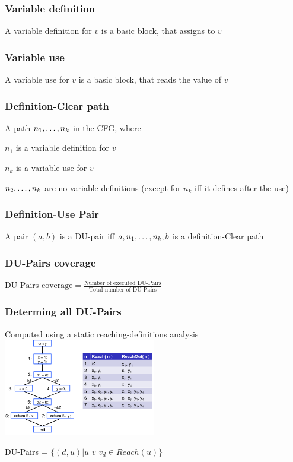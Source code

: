 \subsubsection{Variable definition}
\enumstart
	\item A variable definition for $v$ is a basic block, that assigns to $v$
\enumend

\subsubsection{Variable use}
\enumstart
	\item A variable use for $v$ is a basic block, that reads the value of $v$
\enumend

\subsubsection{Definition-Clear path}
\enumstart
	\item A path $n_1, \mathellipsis, n_k$ in the CFG, where
	\enumstart
		\item $n_1$ is a variable definition for $v$
		\item $n_k$ is a variable use for $v$
		\item $n_2, \mathellipsis, n_{k}$ are no variable definitions (except for $n_k$ iff it defines after the use)
	\enumend
	\item 
\enumend

\subsubsection{Definition-Use Pair}
\enumstart
	\item A pair $(a,b)$ is a DU-pair iff $a, n_1, \mathellipsis, n_k, b$ is a definition-Clear path
\enumend

\subsubsection{DU-Pairs coverage}
\enumstart
	\item $\text{DU-Pairs coverage} = \frac{\text{Number of executed DU-Pairs}}{\text{Total number of DU-Pairs}}$
\enumend

\subsubsection{Determing all DU-Pairs}
\enumstart
	\item Computed using a static reaching-definitions analysis
	\\ \includegraphics[width=0.5\textwidth]{img/reaching_definitions.png}
	\item DU-Pairs = $\{(d,u) | u$  $v$ $v_d \in Reach(u)\}$
\enumend

